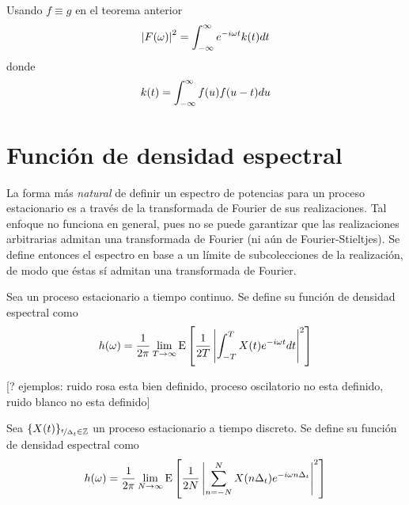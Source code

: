 \begin{corolario}
Usando $f \equiv g$ en el teorema anterior
\begin{equation}
\left| F(\omega) \right|^{2} = \int_{-\infty}^{\infty} e^{- i \omega t} k(t) dt 
\end{equation}
donde 
\begin{equation}
k(t) = \int_{-\infty}^{\infty} f(u) f(u-t) du
\end{equation}
\end{corolario}


\section{Función de densidad espectral}
\label{sec:fde}

La forma más \textit{natural} de definir un espectro de potencias para un proceso estacionario es a través de la transformada de Fourier de sus realizaciones. 
%
Tal enfoque no funciona en general, pues no se puede garantizar que las realizaciones arbitrarias admitan una transformada de Fourier (ni aún de Fourier-Stieltjes).
%
Se define entonces el espectro en base a un límite de subcolecciones de la realización, de modo que éstas sí admitan una transformada de Fourier.

\begin{definicion}
Sea \xt un proceso estacionario a tiempo continuo. Se define su {función de densidad 
espectral} como
\begin{equation}
h(\omega) = \frac{1}{2 \pi} \lim_{T\rightarrow \infty} \mathrm{E}\left[  \frac{1}{2T} 
\left|  \int_{-T}^{T} X(t) e^{-i \omega t} dt \right|^{2}  \right]
\label{txt_FDE_cont}
\end{equation}
\end{definicion}


[? ejemplos: ruido rosa esta bien definido, proceso oscilatorio no esta definido, ruido blanco no esta definido]

\begin{definicion}
Sea $\{X(t)\}_{\nicefrac{t}{\Delta_t}\in \mathbb{Z}}$ un proceso estacionario a tiempo discreto. Se 
define su {función de densidad espectral} como
\begin{equation}
h(\omega) = \frac{1}{2 \pi} \lim_{N\rightarrow \infty} \mathrm{E}\left[  \frac{1}{2N} 
\left|  \sum_{n=-N}^{N} X(n \Delta_t) e^{-i \omega n \Delta_t} \right|^{2}  \right]
\label{txt_FDE_disc}
\end{equation}
\end{definicion}

